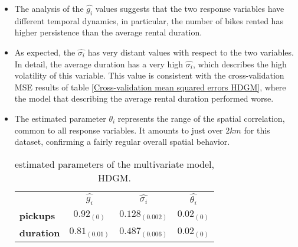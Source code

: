 \begin{itemize}
	\item The analysis of the $\hat{g_i}$ values suggests that the two response variables have different temporal dynamics, in particular, the number of bikes rented has higher persistence than the average rental duration. 
	\item As expected, the $\hat{\sigma_i}$ has very distant values with respect to the two variables. In detail, the average duration has a very high $\hat{\sigma_i}$, which describes the high volatility of this variable. This value is consistent with the cross-validation MSE results of table \ref{Cross-validation mean squared errors HDGM}, where the model that describing the average rental duration performed worse.
	\item  The estimated parameter $\theta_i$ represents the range of the spatial correlation, common to all response variables. It amounts to just over $2 km$ for this dataset, confirming a fairly regular overall spatial behavior.
	\begin{table}[h!]
		\centering
		\renewcommand\arraystretch{1.3}
		\begin{tabular}{|cccc}
			\hline
			& $\hat{g_i}$  & $\hat{\sigma_i}$ & $\hat{\theta_i}$  \\ \cline{2-4} 
			\multicolumn{1}{|l|}{\textbf{pickups}}  &  $0.92_{(0)}$ &  $0.128_{(0.002)}$ & \multicolumn{1}{c}{$0.02_{(0)}$ } \\
			\multicolumn{1}{|l|}{\textbf{duration}} &  $0.81_{(0.01)}$ &  $0.487_{(0.006)}$ &     $0.02_{(0)}$                              
		\end{tabular}
		\caption[Estimated parameters of the multivariate model (HDGM)]{estimated parameters of the multivariate model, HDGM.}
		\label{Bivariate Param_HDGM}
	\end{table}
\end{itemize}
